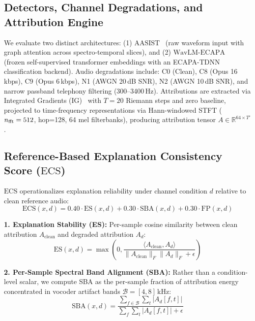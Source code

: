 \documentclass[runningheads]{llncs}
\newcommand{\ecs}{\ensuremath{\mathrm{ECS}}}
\newcommand{\aasist}{\ensuremath{\mathrm{AASIST}}}
\newcommand{\wavlm}{\ensuremath{\mathrm{WavLM}\text{-}\mathrm{ECAPA}}}
\newcommand{\ig}{\ensuremath{\mathrm{IG}}}
\begin{document}
\subsection{Detectors, Channel Degradations, and Attribution Engine}
We evaluate two distinct architectures: (1) \aasist{}~\cite{jung2022aasist} (raw waveform input with graph attention across spectro-temporal slices), and (2) \wavlm{}~\cite{chen2022wavlm} (frozen self-supervised transformer embeddings with an ECAPA-TDNN classification backend).
Audio degradations include: C0 (Clean), C8 (Opus 16\,kbps), C9 (Opus 6\,kbps), N1 (AWGN 20\,dB SNR), N2 (AWGN 10\,dB SNR), and narrow passband telephony filtering (300--3400\,Hz).
Attributions are extracted via Integrated Gradients (\ig{})~\cite{sundararajan2017axiomatic} with $T=20$ Riemann steps and zero baseline, projected to time-frequency representations via Hann-windowed STFT ($n_{\rm fft}=512$, hop=128, 64 mel filterbanks), producing attribution tensor $A \in \mathbb{R}^{64 \times T'}$.

\subsection{Reference-Based Explanation Consistency Score (\texorpdfstring{\ecs{}}{ECS})}
\label{subsec:ecs}
\ecs{} operationalizes explanation reliability under channel condition $d$ relative to clean reference audio:
\begin{equation}
  \ecs(x,d) = 0.40\cdot\mathrm{ES}(x,d) + 0.30\cdot\mathrm{SBA}(x,d) + 0.30\cdot\mathrm{FP}(x,d)
  \label{eq:ecs}
\end{equation}

\textbf{1. Explanation Stability (ES):} Per-sample cosine similarity between clean attribution $A_{\text{clean}}$ and degraded attribution $A_d$:
\begin{equation}
  \mathrm{ES}(x,d) = \max\left(0, \frac{\langle A_{\text{clean}}, A_d \rangle}{\|A_{\text{clean}}\|_F \|A_d\|_F + \epsilon}\right)
\end{equation}

\textbf{2. Per-Sample Spectral Band Alignment (SBA):} Rather than a condition-level scalar, we compute SBA as the per-sample fraction of attribution energy concentrated in vocoder artifact bands $\mathcal{B} = [4, 8]$\,kHz:
\begin{equation}
  \mathrm{SBA}(x,d) = \frac{\sum_{f \in \mathcal{B}} \sum_t |A_d[f,t]|}{\sum_{f} \sum_t |A_d[f,t]| + \epsilon}
\end{equation}
\end{document}
